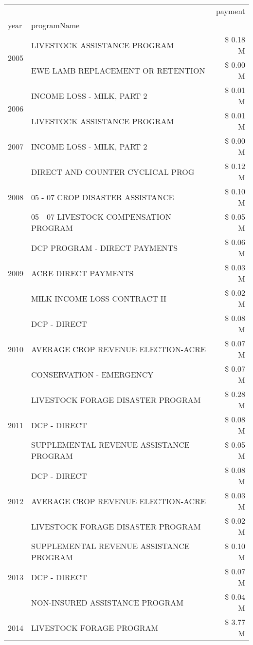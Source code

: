 \begin{tabular}{llr}
\toprule
 &  & payment \\
year & programName &  \\
\midrule
\multirow[t]{2}{*}{2005} & LIVESTOCK ASSISTANCE PROGRAM & \$ 0.18 M \\
 & EWE LAMB REPLACEMENT OR RETENTION & \$ 0.00 M \\
\cline{1-3}
\multirow[t]{2}{*}{2006} & INCOME LOSS - MILK, PART 2 & \$ 0.01 M \\
 & LIVESTOCK ASSISTANCE PROGRAM & \$ 0.01 M \\
\cline{1-3}
2007 & INCOME LOSS - MILK, PART 2 & \$ 0.00 M \\
\cline{1-3}
\multirow[t]{3}{*}{2008} & DIRECT AND COUNTER CYCLICAL PROG & \$ 0.12 M \\
 & 05 - 07 CROP DISASTER ASSISTANCE & \$ 0.10 M \\
 & 05 - 07 LIVESTOCK COMPENSATION PROGRAM & \$ 0.05 M \\
\cline{1-3}
\multirow[t]{3}{*}{2009} & DCP PROGRAM - DIRECT PAYMENTS & \$ 0.06 M \\
 & ACRE DIRECT PAYMENTS & \$ 0.03 M \\
 & MILK INCOME LOSS CONTRACT II & \$ 0.02 M \\
\cline{1-3}
\multirow[t]{3}{*}{2010} & DCP - DIRECT & \$ 0.08 M \\
 & AVERAGE CROP REVENUE ELECTION-ACRE & \$ 0.07 M \\
 & CONSERVATION - EMERGENCY & \$ 0.07 M \\
\cline{1-3}
\multirow[t]{3}{*}{2011} & LIVESTOCK FORAGE DISASTER PROGRAM & \$ 0.28 M \\
 & DCP - DIRECT & \$ 0.08 M \\
 & SUPPLEMENTAL REVENUE ASSISTANCE PROGRAM & \$ 0.05 M \\
\cline{1-3}
\multirow[t]{3}{*}{2012} & DCP - DIRECT & \$ 0.08 M \\
 & AVERAGE CROP REVENUE ELECTION-ACRE & \$ 0.03 M \\
 & LIVESTOCK FORAGE DISASTER PROGRAM & \$ 0.02 M \\
\cline{1-3}
\multirow[t]{3}{*}{2013} & SUPPLEMENTAL REVENUE ASSISTANCE PROGRAM & \$ 0.10 M \\
 & DCP - DIRECT & \$ 0.07 M \\
 & NON-INSURED ASSISTANCE PROGRAM & \$ 0.04 M \\
\cline{1-3}
\multirow[t]{3}{*}{2014} & LIVESTOCK FORAGE PROGRAM & \$ 3.77 M \\

\end{tabular}
